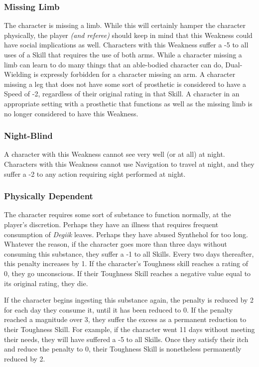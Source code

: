 \documentclass[oneside]{book}
\begin{document}
\begin{multicols}{2}
\subsubsection{Missing Limb}
The character is missing a limb. While this will certainly hamper the character physically, the player \emph{(and referee)} should keep in mind that this Weakness could have social implications as well. Characters with this Weakness suffer a -5 to all uses of a Skill that requires the use of both arms. While a character missing a limb can learn to do many things that an able-bodied character can do, Dual-Wielding is expressly forbidden for a character missing an arm. A character missing a leg that does not have some sort of prosthetic is considered to have a Speed of -2, regardless of their original rating in that Skill. A character in an appropriate setting with a prosthetic that functions as well as the missing limb is no longer considered to have this Weakness.
\subsubsection{Night-Blind}
A character with this Weakness cannot see very well (or at all) at night. Characters with this Weakness cannot use Navigation to travel at night, and they suffer a -2 to any action requiring sight performed at night. 
\subsubsection{Physically Dependent}
The character requires some sort of substance to function normally, at the player's discretion. Perhaps they have an illness that requires frequent consumption of \emph{Degiik} leaves. Perhaps they have abused Synthehol for too long. Whatever the reason, if the character goes more than three days without consuming this substance, they suffer a -1 to all Skills. Every two days thereafter, this penalty increases by 1. If the character's Toughness skill reaches a rating of 0, they go unconscious. If their Toughness Skill reaches a negative value equal to its original rating, they die. 

If the character begins ingesting this substance again, the penalty is reduced by 2 for each day they consume it, until it has been reduced to 0. If the penalty reached a magnitude over 3, they suffer the excess as a permanent reduction to their Toughness Skill. For example, if the character went 11 days without meeting their needs, they will have suffered a -5 to all Skills. Once they satisfy their itch and reduce the penalty to 0, their Toughness Skill is nonetheless permanently reduced by 2. 


\end{multicols}
\end{document}
